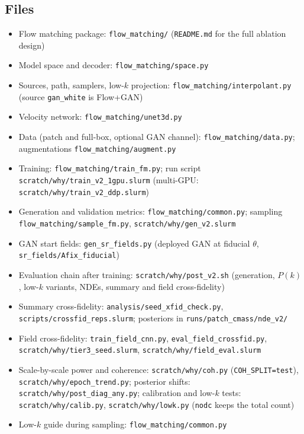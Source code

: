 \subsection{Files}
\begin{itemize}\itemsep0pt
  \item Flow matching package: \texttt{flow\_matching/} (\texttt{README.md} for the
  full ablation design)
  \item Model space and decoder: \texttt{flow\_matching/space.py}
  \item Sources, path, samplers, low-$k$ projection: \texttt{flow\_matching/interpolant.py}
  (source \texttt{gan\_white} is Flow+GAN)
  \item Velocity network: \texttt{flow\_matching/unet3d.py}
  \item Data (patch and full-box, optional GAN channel): \texttt{flow\_matching/data.py};
  augmentations \texttt{flow\_matching/augment.py}
  \item Training: \texttt{flow\_matching/train\_fm.py}; run script
  \texttt{scratch/why/train\_v2\_1gpu.slurm} (multi-GPU:
  \texttt{scratch/why/train\_v2\_ddp.slurm})
  \item Generation and validation metrics: \texttt{flow\_matching/common.py};
  sampling \texttt{flow\_matching/sample\_fm.py}, \texttt{scratch/why/gen\_v2.slurm}
  \item GAN start fields: \texttt{gen\_sr\_fields.py} (deployed GAN at fiducial
  $\theta$, \texttt{sr\_fields/Afix\_fiducial})
  \item Evaluation chain after training: \texttt{scratch/why/post\_v2.sh}
  (generation, $P(k)$, low-$k$ variants, NDEs, summary and field cross-fidelity)
  \item Summary cross-fidelity: \texttt{analysis/seed\_xfid\_check.py},
  \texttt{scripts/crossfid\_reps.slurm}; posteriors in \texttt{runs/patch\_cmass/nde\_v2/}
  \item Field cross-fidelity: \texttt{train\_field\_cnn.py}, \texttt{eval\_field\_crossfid.py},
  \texttt{scratch/why/tier3\_seed.slurm}, \texttt{scratch/why/field\_eval.slurm}
  \item Scale-by-scale power and coherence: \texttt{scratch/why/coh.py}
  (\texttt{COH\_SPLIT=test}), \texttt{scratch/why/epoch\_trend.py};
  posterior shifts: \texttt{scratch/why/post\_diag\_any.py};
  calibration and low-$k$ tests: \texttt{scratch/why/calib.py}, \texttt{scratch/why/lowk.py}
  (\texttt{nodc} keeps the total count)
  \item Low-$k$ guide during sampling: \texttt{flow\_matching/common.py}

\end{itemize}
